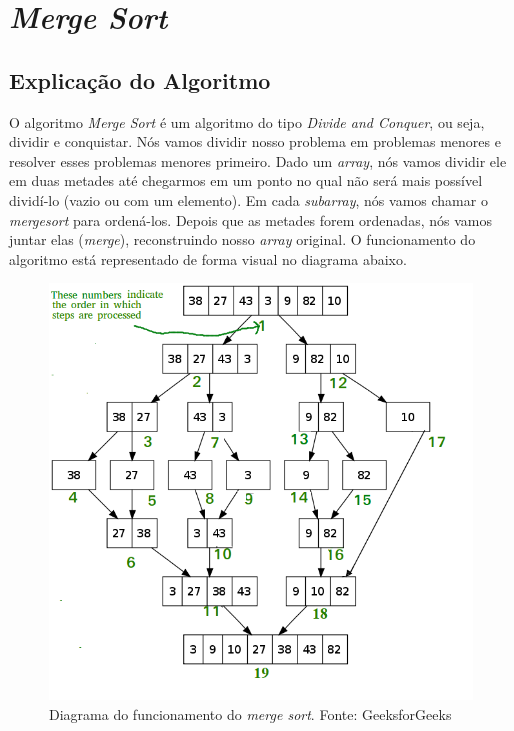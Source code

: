 \section{\textit{Merge Sort}}

\subsection{Explicação do Algoritmo}
O algoritmo \textit{Merge Sort} é um algoritmo do tipo \textit{Divide and Conquer}, ou seja, dividir e conquistar. Nós vamos dividir nosso problema
em problemas menores e resolver esses problemas menores primeiro. Dado um \textit{array}, nós vamos dividir ele em duas metades até chegarmos em um ponto
no qual não será mais possível dividí-lo (vazio ou com um elemento). Em cada \textit{subarray}, nós vamos chamar o \textit{mergesort} para ordená-los.
Depois que as metades forem ordenadas, nós vamos juntar elas (\textit{merge}), reconstruindo nosso \textit{array} original. O funcionamento do algoritmo está representado de forma visual
no diagrama abaixo.

\begin{figure}[H]
    \centering
    \includegraphics[scale=0.6]{assets/mergesort_diagram.png}
    \caption{Diagrama do funcionamento do \textit{merge sort}. Fonte: GeeksforGeeks}
    \label{fig:merge_sort_0}
\end{figure}

